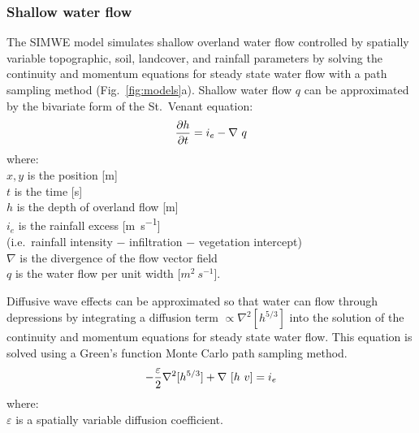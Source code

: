 \documentclass[gmd, manuscript]{copernicus}
\begin{document}

\subsubsection{Shallow water flow}

The SIMWE model
simulates shallow overland water flow
controlled by spatially variable topographic, soil, landcover, 
and rainfall parameters
by solving the continuity and momentum equations 
for steady state water flow with a path sampling method
(Fig.~\ref{fig:models}a). 
Shallow water flow $q$ can be approximated by
the bivariate form of the St.~Venant equation:
\begin{equation}
\label{eq:water}
{\partial h \over \partial t} =
 i_e - \nabla ~ q
\end{equation}
{\small
\noindent
where: \\
\noindent
\hspace*{0.5em} $x, y$ is the position [\unit{m}]\\
\hspace*{0.5em} $t$ is the time [\unit{s}] \\
\hspace*{0.5em} $h$ is the depth of overland flow [\unit{m}]\\
\hspace*{0.5em} $i_e$ is the rainfall excess [\unit{m~s^{-1}}] \\
\hspace*{0.5em} (i.e.~rainfall intensity $-$ infiltration $-$ vegetation intercept)\\
\hspace*{0.5em} $\nabla$ is the divergence of the flow vector field\\
\hspace*{0.5em} $q$ is the water flow per unit width [$\unit{m}^2~\unit{s}^{-1}$]. \\
}

\noindent
Diffusive wave effects can be approximated
so that water can flow through depressions 
by integrating a diffusion term 
$ \propto \nabla^2 [h^{5/3}]$
into the solution of the continuity and momentum equations 
for steady state water flow.
This equation is solved using a 
Green's function Monte Carlo path sampling method. 
\begin{equation}
\label{eq:difwater}
-{\varepsilon\over 2 }\nabla^2 [h^{5/3}]
+\nabla ~ [ h~v] = i_e
\end{equation}
{\small
\noindent
 where: \\
 \noindent
 \hspace*{0.5em} $\varepsilon$ is a spatially variable diffusion coefficient. \\
}
\end{document}

